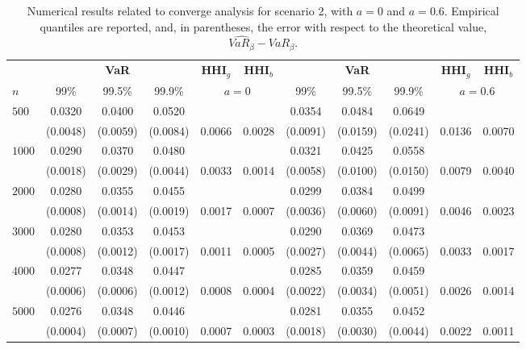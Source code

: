 \documentclass[preprint,12pt]{article}
\begin{document}
\begin{table}[h!]
\centering
\begin{tabular}{l|ccccc|ccccc|}
\hline \hline
 & \multicolumn{3}{c}{\textbf{VaR}} & $\mathbf{HHI}_g$ &$\mathbf{HHI}_b$  & &  {\textbf{VaR}} & &$\mathbf{HHI}_g$ &$\mathbf{HHI}_b$\\
\cmidrule(lr){2-4} \cmidrule(lr){5-6} \cmidrule(lr){7-9} \cmidrule(lr){10-11}
 $n$ & 99\% & 99.5\% & 99.9\% &  \multicolumn{2}{c|}{$a=0$}  & 99\% &99.5\% & 99.9\% & \multicolumn{2}{c|}{$a=0.6$} \\
\midrule

\multirow{2}{*}{$500$} 
   &  0.0320  &  0.0400  &  0.0520 & & &  0.0354  &  0.0484 &   0.0649 & &\\
   & (0.0048) &   (0.0059) &   (0.0084) & 0.0066 & 0.0028 & (0.0091) &   (0.0159)  &  (0.0241) & 0.0136 & 0.0070\\
\midrule

\multirow{2}{*}{$1000$} 
   & 0.0290  &  0.0370  &  0.0480 & & & 0.0321  &  0.0425  &  0.0558 & &\\
   & (0.0018)  &  (0.0029)  &  (0.0044) & 0.0033 & 0.0014 & (0.0058) &   (0.0100) &   (0.0150) & 0.0079 & 0.0040\\
\midrule

\multirow{2}{*}{$2000$} 
   & 0.0280  &  0.0355  &  0.0455 & & & 0.0299  &  0.0384  &  0.0499 & &\\
   &(0.0008)  &  (0.0014)  &  (0.0019) & 0.0017 & 0.0007 & (0.0036)  &  (0.0060)  &  (0.0091) & 0.0046 & 0.0023\\
\midrule

\multirow{2}{*}{$3000$} 
   & 0.0280  &  0.0353  &  0.0453 & & & 0.0290  &  0.0369  &  0.0473& &\\
   & (0.0008)  &  (0.0012)  &  (0.0017) & 0.0011 & 0.0005 & (0.0027)  &  (0.0044)  &  (0.0065) & 0.0033 & 0.0017 \\
\midrule

\multirow{2}{*}{$4000$} 
   & 0.0277  &  0.0348  &  0.0447 & & & 0.0285  &  0.0359  &  0.0459& &\\
   & (0.0006)  &  (0.0006)  &  (0.0012) & 0.0008 & 0.0004 & (0.0022)  & (0.0034) & (0.0051) & 0.0026 & 0.0014\\
\midrule

\multirow{2}{*}{$5000$} 
   & 0.0276  &  0.0348  &  0.0446 & & & 0.0281 & 0.0355 & 0.0452 & &\\
   & (0.0004) &   (0.0007)  &  (0.0010) & 0.0007 & 0.0003 &  (0.0018)  &  (0.0030)  &  (0.0044) & 0.0022 & 0.0011\\
\hline \hline
\end{tabular}
\caption{Numerical results related to converge analysis for scenario 2, with $a=0$ and $a=0.6$. Empirical quantiles are reported, and, in parentheses, the error with respect to the theoretical value, $\widehat{VaR_{\beta}} - VaR_{\beta}$.  }
\label{Tab:convscenario2}
\end{table}
\end{document}
